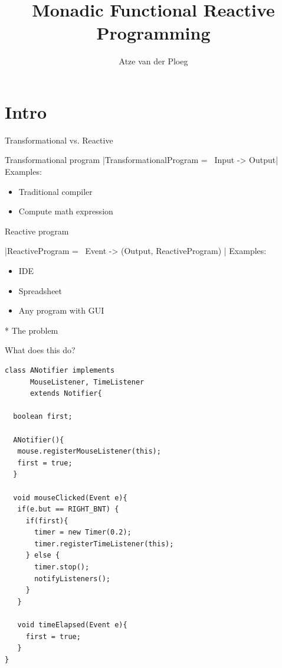 \documentclass{beamer}
\title{Monadic Functional Reactive Programming}
\author{Atze van der Ploeg}
\institute{
Centrum Wiskunde \& Informatica, Amsterdam, The Netherlands}
\begin{document}



\begin{frame}[plain]
\begin{center}
  \scalebox{12}{$\bind$}
\end{center}
\vspace{-0.5cm}
  \titlepage
\end{frame}

\section{Intro}
\begin{frame}{Transformational vs. Reactive}
\begin{block}{Transformational program}
|TransformationalProgram =~ Input -> Output|\\
Examples: \begin{itemize}
\item Traditional compiler
\item Compute math expression
\end{itemize}
\end{block}
\begin{block}{Reactive program}

|ReactiveProgram =~ Event -> (Output, ReactiveProgram) |
Examples: \begin{itemize}
\item IDE
\item Spreadsheet
\item Any program with GUI
\end{itemize}
\end{block}
\end{frame}

\begin{frame}{* The problem}


\begin{block}{What does this do?}
\tiny
\begin{verbatim}
class ANotifier implements
      MouseListener, TimeListener 
      extends Notifier{

  boolean first;

  ANotifier(){
   mouse.registerMouseListener(this);
   first = true;
  }

  void mouseClicked(Event e){
   if(e.but == RIGHT_BNT) {
     if(first){
       timer = new Timer(0.2);
       timer.registerTimeListener(this);
     } else {
       timer.stop();
       notifyListeners();
     } 
   }

   void timeElapsed(Event e){
     first = true;
   }
}
     

\end{verbatim}

\end{block}
\end{frame}
\end{document}
